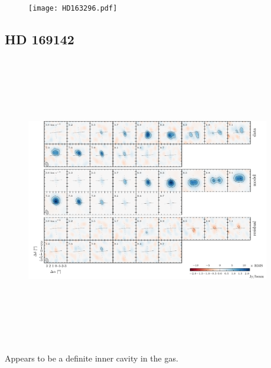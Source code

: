 \documentclass[twocolumn]{aastex6}
\begin{document}
\begin{figure}[htb]
\begin{center}
  \texttt{[image: HD163296.pdf]}
  \end{center}
\end{figure}

\subsection{HD 169142}

\begin{figure}[htb]
\begin{center}
  \includegraphics[draft, width=0.95\textwidth, height=5in]{HD169142.pdf}
  \end{center}
\end{figure}

Appears to be a definite inner cavity in the gas.
\end{document}
